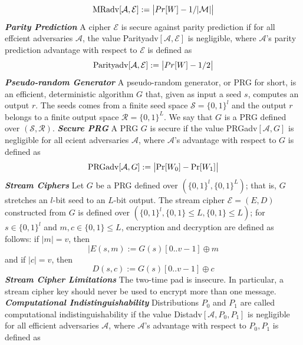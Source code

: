 \documentclass[a4paper,12pt,UTF8]{ctexart}
\begin{document}
\begin{spacing}{1.1}
\begin{equation}
{\rm MRadv}[\mathcal{A},\mathcal{E}]:=\big|Pr[W] - 1/|\mathcal{M}|\big|
\end{equation}
\indent\emph{\textbf{Parity Prediction}} A cipher $\mathcal{E}$ is secure against parity prediction if for all effcient adversaries $\mathcal{A}$, the value Parityadv$[\mathcal{A},\mathcal{E}]$ is negligible, where $\mathcal{A}$'s parity prediction advantage with respect to $\mathcal{E}$ is defined as
\begin{equation}
{\rm Parityadv}[\mathcal{A},\mathcal{E}]:=\big|Pr[W] - 1/2\big|
\end{equation}
\indent\emph{\textbf{Pseudo-random Generator}} A pseudo-random generator, or PRG for short, is an efficient, deterministic algorithm $G$ that, given as input a seed $s$, computes an output $r$. The seeds comes from a finite seed space $\mathcal{S} = \{0,1\}^l$ and the output $r$ belongs to a finite output space $\mathcal{R} = \{0,1\}^L$. We say that $G$ is a PRG defined over $(\mathcal{S},\mathcal{R})$. \vspace{3mm}
\newline\indent\emph{\textbf{Secure PRG}} A PRG $G$ is secure if the value PRGadv$[\mathcal{A},G]$ is negligible for all ecient adversaries $\mathcal{A}$, where $\mathcal{A}$'s advantage with respect to $G$ is defined as
\begin{equation}
{\rm PRGadv}[\mathcal{A},G] := \big|{\rm Pr}[W_0]-{\rm Pr}[W_1]\big|
\end{equation}
\indent\emph{\textbf{Stream Ciphers}} Let $G$ be a PRG defined over $(\{0,1\}^l,\{0,1\}^L)$; that is, $G$ stretches an $l$-bit seed to an $L$-bit output. The stream cipher $\mathcal{E} = (E,D)$ constructed from $G$ is defined over $(\{0,1\}^l,\{0,1\}\leq{L},\{0,1\}\leq{L})$; for $s \in{\{0,1\}^l}$ and $m,c \in{\{0,1\}\leq{L}}$, encryption and decryption are defined as follows: if $|m| = v$, then
\begin{equation}
|E(s,m) := G(s)[0..v-1] \oplus m
\end{equation}
and if $|c| = v$, then
\begin{equation}
D(s,c) := G(s)[0..v-1] \oplus c
\end{equation}
\indent\emph{\textbf{Stream Cipher Limitations}} The two-time pad is insecure. In particular, a stream cipher key should never be used to encrypt more than one message. \vspace{3mm}
\newline\indent\emph{\textbf{Computational Indistinguishability}} Distributions $P_0$ and $P_1$ are called computational indistinguishability if the value Distadv$[\mathcal{A},P_0,P_1]$ is negligible for all efficient adversaries $\mathcal{A}$, where $\mathcal{A}$'s advantage with respect to $P_0,P_1$ is defined as

\end{spacing}
\end{document}
